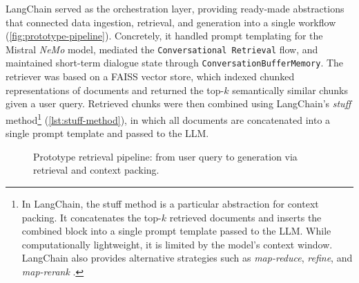 \begin{spacing}{1.5}
LangChain served as the orchestration layer, providing ready-made abstractions that connected data ingestion, retrieval, and generation into a single workflow (\autoref{fig:prototype-pipeline}). Concretely, it handled prompt templating for the Mistral \textit{NeMo} model, mediated the \texttt{Conversational Retrieval} flow, and maintained short-term dialogue state through \texttt{ConversationBufferMemory}. The retriever was based on a FAISS vector store, which indexed chunked representations of documents and returned the top-$k$ semantically similar chunks given a user query. Retrieved chunks were then combined using LangChain’s \textit{stuff} method\footnote{In LangChain, the stuff method is a particular abstraction for context packing. It concatenates the top-$k$ retrieved documents and inserts the combined block into a single prompt template passed to the LLM. While computationally lightweight, it is limited by the model’s context window. LangChain also provides alternative strategies such as \textit{map-reduce}, \textit{refine}, and \textit{map-rerank} \citep{topsakal_creating_2023}.} (\autoref{lst:stuff-method}), in which all documents are concatenated into a single prompt template and passed to the LLM.

\vspace{0.8em}
\begin{figure}[H]
\centering
\begin{adjustbox}{max width=\linewidth}
\end{adjustbox}
\caption{Prototype retrieval pipeline: from user query to generation via retrieval and context packing.}
\label{fig:prototype-pipeline}
\end{figure}


\end{spacing}

